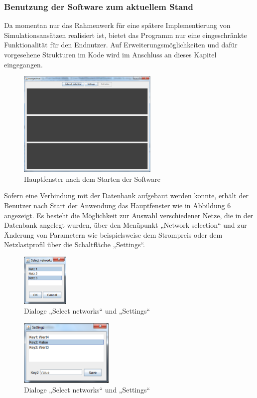 \documentclass[12pt,titlepage]{article}
\begin{document}
\subsubsection{Benutzung der Software zum aktuellem Stand}
Da momentan nur das Rahmenwerk für eine spätere Implementierung von Simulationsansätzen realisiert ist, bietet das Programm nur eine eingeschränkte Funktionalität für den Endnutzer. Auf Erweiterungsmöglichkeiten und dafür vorgesehene Strukturen im Kode wird im Anschluss an dieses Kapitel eingegangen.
\begin{figure}[!ht]
	\centering
	\includegraphics[width=0.6\textwidth]{ErgSoftwareUse1}
	\caption{Hauptfenster nach dem Starten der Software}
	\label{fig:ErgSoftwareUse1}
\end{figure}
Sofern eine Verbindung mit der Datenbank aufgebaut werden konnte, erhält der Benutzer nach Start der Anwendung das Hauptfenster wie in Abbildung 6 angezeigt. Es besteht die Möglichkeit zur Auswahl verschiedener Netze, die in der Datenbank angelegt wurden, über den Menüpunkt „Network selection“ und zur Änderung von Parametern wie beispielsweise dem Strompreis oder dem Netzlastprofil über die Schaltfläche „Settings“.
\begin{figure}[!ht]
	\centering
	\includegraphics[width=0.2\textwidth]{ErgSoftwareUse2}
	\caption{Dialoge „Select networks“ und „Settings“}
	\label{fig:ErgSoftwareUse2}
\end{figure}
\begin{figure}[!ht]
	\centering
	\includegraphics[width=0.4\textwidth]{ErgSoftwareUse3}
	\caption{Dialoge „Select networks“ und „Settings“}
	\label{fig:ErgSoftwareUse3}
\end{figure}
\end{document}
